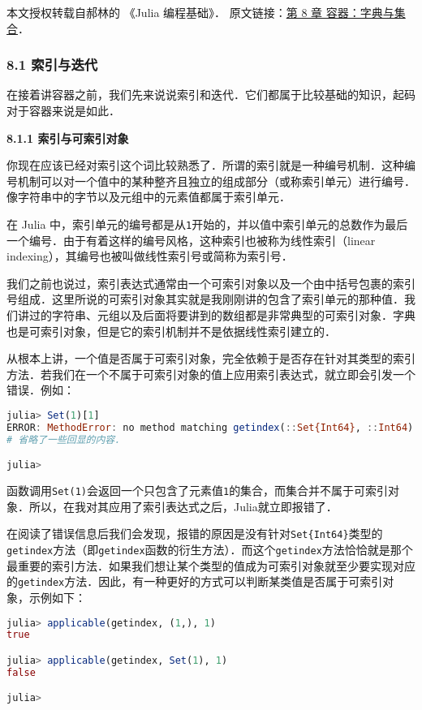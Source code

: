 
本文授权转载自郝林的 《Julia 编程基础》． 原文链接：\href{https://github.com/hyper0x/JuliaBasics/blob/master/book/ch08.md}{第 8 章 容器：字典与集合}．


\subsubsection{8.1 索引与迭代}

在接着讲容器之前，我们先来说说索引和迭代．它们都属于比较基础的知识，起码对于容器来说是如此．

\textbf{8.1.1 索引与可索引对象}

你现在应该已经对索引这个词比较熟悉了．所谓的索引就是一种编号机制．这种编号机制可以对一个值中的某种整齐且独立的组成部分（或称索引单元）进行编号．像字符串中的字节以及元组中的元素值都属于索引单元．

在 Julia 中，索引单元的编号都是从\verb|1|开始的，并以值中索引单元的总数作为最后一个编号．由于有着这样的编号风格，这种索引也被称为线性索引（linear indexing），其编号也被叫做线性索引号或简称为索引号．

我们之前也说过，索引表达式通常由一个可索引对象以及一个由中括号包裹的索引号组成．这里所说的可索引对象其实就是我刚刚讲的包含了索引单元的那种值．我们讲过的字符串、元组以及后面将要讲到的数组都是非常典型的可索引对象．字典也是可索引对象，但是它的索引机制并不是依据线性索引建立的．

从根本上讲，一个值是否属于可索引对象，完全依赖于是否存在针对其类型的索引方法．若我们在一个不属于可索引对象的值上应用索引表达式，就立即会引发一个错误．例如：
\begin{lstlisting}[language=julia]
julia> Set(1)[1]
ERROR: MethodError: no method matching getindex(::Set{Int64}, ::Int64)
# 省略了一些回显的内容．

julia> 
\end{lstlisting}

函数调用\verb|Set(1)|会返回一个只包含了元素值\verb|1|的集合，而集合并不属于可索引对象．所以，在我对其应用了索引表达式之后，Julia就立即报错了．

在阅读了错误信息后我们会发现，报错的原因是没有针对\verb|Set{Int64}|类型的\verb|getindex|方法（即\verb|getindex|函数的衍生方法）．而这个\verb|getindex|方法恰恰就是那个最重要的索引方法．如果我们想让某个类型的值成为可索引对象就至少要实现对应的\verb|getindex|方法．因此，有一种更好的方式可以判断某类值是否属于可索引对象，示例如下：
\begin{lstlisting}[language=julia]
julia> applicable(getindex, (1,), 1)
true

julia> applicable(getindex, Set(1), 1)
false

julia> 
\end{lstlisting}


